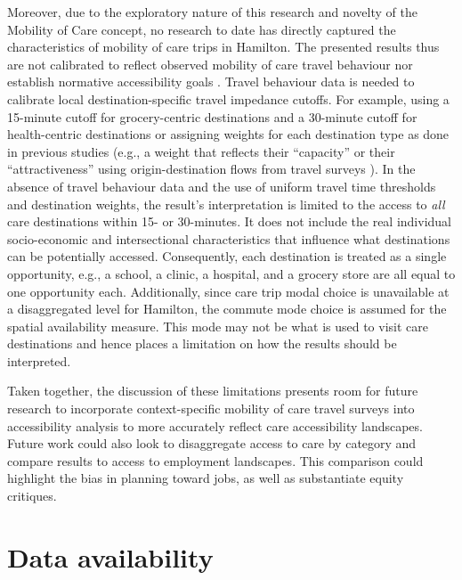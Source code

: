 \documentclass[
  authoryear,
  preprint,
  3p]{elsarticle}
\begin{document}
Moreover, due to the exploratory nature of this research and novelty of
the Mobility of Care concept, no research to date has directly captured
the characteristics of mobility of care trips in Hamilton. The presented
results thus are not calibrated to reflect observed mobility of care
travel behaviour nor establish normative accessibility goals
\citep{paezMeasuringAccessibilityPositive2012}. Travel behaviour data is
needed to calibrate local destination-specific travel impedance cutoffs.
For example, using a 15-minute cutoff for grocery-centric destinations
and a 30-minute cutoff for health-centric destinations or assigning
weights for each destination type as done in previous studies (e.g., a
weight that reflects their ``capacity''
\citep{liMeasuringMultiactivities2024} or their ``attractiveness'' using
origin-destination flows from travel surveys
\citep[\citet{chengInvestigatingWalkingAccessibility2019}]{graellsCityCitiesMeasuring2021}).
In the absence of travel behaviour data and the use of uniform travel
time thresholds and destination weights, the result's interpretation is
limited to the access to \emph{all} care destinations within 15- or
30-minutes. It does not include the real individual socio-economic and
intersectional characteristics that influence what destinations can be
potentially accessed. Consequently, each destination is treated as a
single opportunity, e.g., a school, a clinic, a hospital, and a grocery
store are all equal to one opportunity each. Additionally, since care
trip modal choice is unavailable at a disaggregated level for Hamilton,
the commute mode choice is assumed for the spatial availability measure.
This mode may not be what is used to visit care destinations and hence
places a limitation on how the results should be interpreted.

Taken together, the discussion of these limitations presents room for
future research to incorporate context-specific mobility of care travel
surveys into accessibility analysis to more accurately reflect care
accessibility landscapes. Future work could also look to disaggregate
access to care by category and compare results to access to employment
landscapes. This comparison could highlight the bias in planning toward
jobs, as well as substantiate equity critiques.

\section{Data availability}\label{data-availability}
\end{document}
